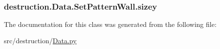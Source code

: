 \hypertarget{classdestruction_1_1_data_1_1_set_pattern_wall_aa00ba6231561e5751e31daa1a4ddac69}{
\subsubsection[{sizey}]{\setlength{\rightskip}{0pt plus 5cm}destruction.\-Data.\-Set\-Pattern\-Wall.\-sizey}}\label{classdestruction_1_1_data_1_1_set_pattern_wall_aa00ba6231561e5751e31daa1a4ddac69}


The documentation for this class was generated from the following file\-:\begin{DoxyCompactItemize}
\item 
src/destruction/\hyperlink{_data_8py}{Data.\-py}\end{DoxyCompactItemize}
